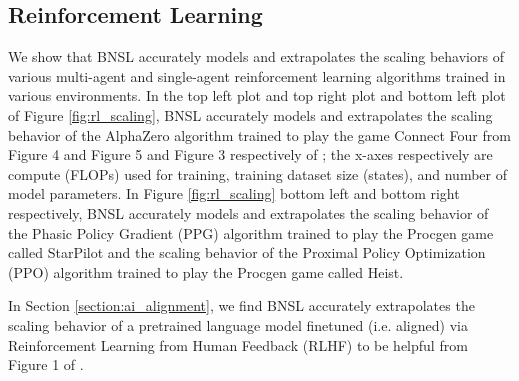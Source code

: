 \documentclass{article} %
\begin{document}
\vspace{-3.6mm}

\subsection{Reinforcement Learning}
\label{section:reinforcement_learning}

\vspace{-3.4mm}

We show that BNSL accurately models and extrapolates the scaling behaviors of various multi-agent and single-agent reinforcement learning algorithms trained in various environments. In the top left plot and top right plot and bottom left plot of Figure \ref{fig:rl_scaling}, BNSL accurately models and extrapolates the scaling behavior of the AlphaZero algorithm trained to play the game Connect Four from Figure 4 and Figure 5 and Figure 3 respectively of \cite{neumann2022scaling}; the x-axes respectively are compute (FLOPs) used for training, training dataset size (states), and number of model parameters. In Figure \ref{fig:rl_scaling} bottom left and bottom right respectively, BNSL accurately models and extrapolates the scaling behavior of the Phasic Policy Gradient (PPG) algorithm \citep{cobbe2021phasic} trained to play the Procgen \citep{cobbe2020leveraging} game called StarPilot and the scaling behavior of the Proximal Policy Optimization (PPO) algorithm \citep{schulman2017proximal} trained to play the Procgen \citep{cobbe2020leveraging} game called Heist.

In Section \ref{section:ai_alignment}, we find BNSL accurately extrapolates the scaling behavior of a pretrained language model finetuned (i.e. aligned) via Reinforcement Learning from Human Feedback (RLHF) to be helpful from Figure 1 of \cite{bai2022training}.
\end{document}
